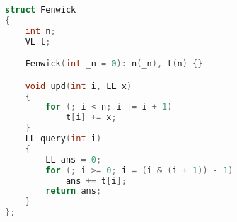 \begin{lstlisting}[caption={fenwick.hpp}, language=C++]
struct Fenwick
{
	int n;
	VL t;

	Fenwick(int _n = 0): n(_n), t(n) {}

	void upd(int i, LL x)
	{
		for (; i < n; i |= i + 1)
			t[i] += x;
	}
	LL query(int i)
	{
		LL ans = 0;
		for (; i >= 0; i = (i & (i + 1)) - 1)
			ans += t[i];
		return ans;
	}
};
\end{lstlisting}
